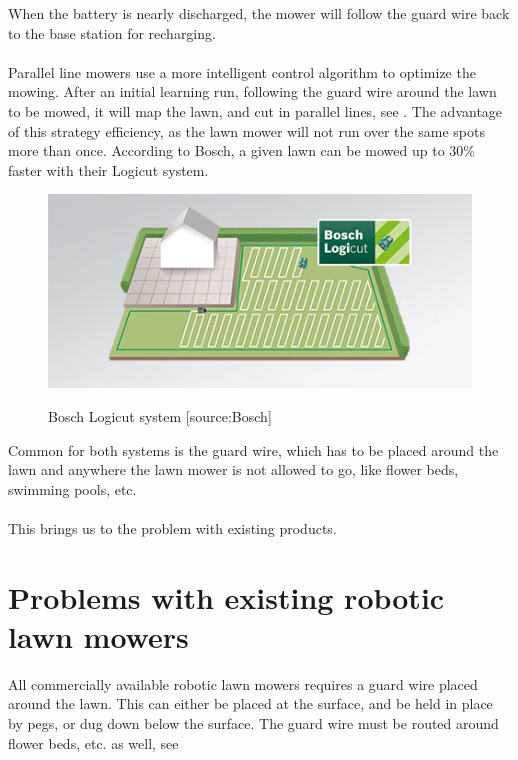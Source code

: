 \noindent
When the battery is nearly discharged, the mower will follow the guard wire back to the base station for recharging.\\\\
\noindent
Parallel line mowers use a more intelligent control algorithm to optimize the mowing. After an initial learning run, following the guard wire around the lawn to be mowed, it will map the lawn, and cut in parallel lines, see . The advantage of this strategy efficiency, as the lawn mower will not run over the same spots more than once. According to Bosch, a given lawn can be mowed up to 30\% faster with their Logicut system.
 

\begin{figure}[H]
\centering
\includegraphics[scale=0.8]{figures/logicut.jpg} 
\label{fig:logicut}
\caption{Bosch Logicut system [source:Bosch]} 
\end{figure}

\noindent
Common for both systems is the guard wire, which has to be placed around the lawn and anywhere the lawn mower is not allowed to go, like flower beds, swimming pools, etc. \\\\
\noindent
This brings us to the problem with existing products.

\section{Problems with existing robotic lawn mowers}
All commercially available robotic lawn mowers requires a guard wire placed around the lawn. This can either be placed at the surface, and be held in place by pegs, or dug down below the surface. The guard wire must be routed around flower beds, etc. as well, see 

